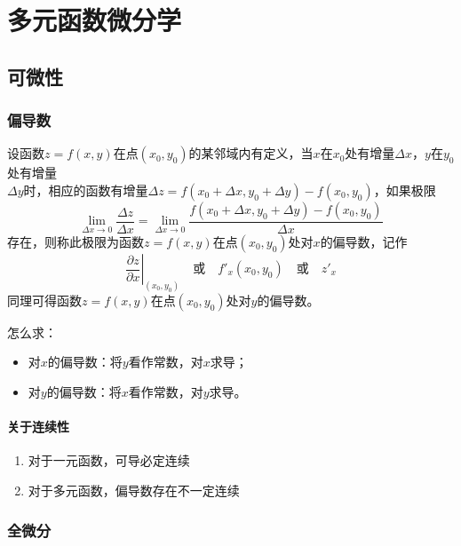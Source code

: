 \chapter{多元函数微分学}

\section{可微性}

\subsection{偏导数}

\begin{definition}
    设函数$z=f(x,y)$在点$(x_0,y_0)$的某邻域内有定义，当$x$在$x_0$处有增量$\Delta x$，$y$在$y_0$处有增量\\$\Delta y$时，相应的函数有增量$\Delta z=f(x_0+\Delta x,y_0+\Delta y)-f(x_0,y_0)$，如果极限
        \[
            \lim_{\Delta x\to 0}\frac{\Delta z}{\Delta x}=\lim_{\Delta x\to 0}\frac{f(x_0+\Delta x,y_0+\Delta y)-f(x_0,y_0)}{\Delta x}
        \]
        存在，则称此极限为函数$z=f(x,y)$在点$(x_0,y_0)$处对$x$的偏导数，记作
        \[
            \left.\frac{\partial z}{\partial x}\right|_{(x_0,y_0)}\quad\text{或}\quad f'_x(x_0,y_0)\quad\text{或}\quad z'_x
        \]
        同理可得函数$z=f(x,y)$在点$(x_0,y_0)$处对$y$的偏导数。
\end{definition}

怎么求：
\begin{itemize}
    \item 对$x$的偏导数：将$y$看作常数，对$x$求导；
    \item 对$y$的偏导数：将$x$看作常数，对$y$求导。
\end{itemize}

\subsubsection{关于连续性}

\begin{enumerate}
    \item 对于一元函数，可导必定连续
    \item 对于多元函数，偏导数存在不一定连续
\end{enumerate}

\subsection{全微分}

